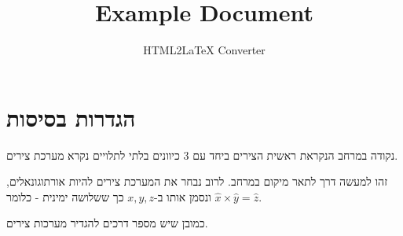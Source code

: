 \documentclass{tstextbook}
\begin{document}
\title{Example Document}
\author{HTML2LaTeX Converter}
\maketitle


\section{הגדרות בסיסות}

\begin{definition}
נקודה במרחב הנקראת ראשית הצירים ביחד עם 3 כיוונים בלתי לתלויים נקרא מערכת צירים.

\end{definition}
זהו למעשה דרך לתאר מיקום במרחב. לרוב נבחר את המערכת צירים להיות אורתוגונאלים, ונסמן אותו ב-\(x,y,z\) כך ששלושה ימינית - כלומר \(\hat{x} \times \hat{y} = \hat{z}\).

כמובן שיש מספר דרכים להגדיר מערכות צירים.
\end{document}
